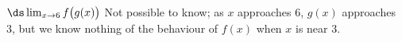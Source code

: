 {$\ds \lim_{x\to6}f\big(g(x)\big)$}
{Not possible to know; as $x$ approaches 6, $g(x)$ approaches 3, but we know nothing of the behaviour of $f(x)$ when $x$ is near 3.}

